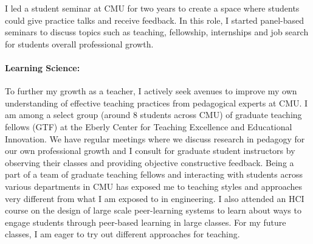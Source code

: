 \documentclass[10pt]{article}
\begin{document}
I led a student seminar at CMU for two years to create a space where students could give practice talks and receive feedback. In this role, I started panel-based seminars to discuss topics such as teaching, fellowship, internships and job search for students overall professional growth. 


\paragraph{Learning Science: }To further my growth as a teacher, I actively seek avenues to improve my own understanding of effective teaching practices from pedagogical experts at CMU. I am among a select group (around 8 students across CMU) of graduate teaching fellows (GTF) at the Eberly Center for Teaching Excellence and Educational Innovation. We have regular meetings where we discuss research in pedagogy for our own professional growth and I consult for graduate student instructors by observing their classes and providing objective constructive feedback. Being a part of a team of graduate teaching fellows and interacting with students across various departments in CMU has exposed me to teaching styles and approaches very different from what I am exposed to in engineering. I also attended an HCI course on the design of large scale peer-learning systems to learn about ways to engage students through peer-based learning in large classes. For my future classes, I am eager to try out different approaches for teaching. %
\end{document}
